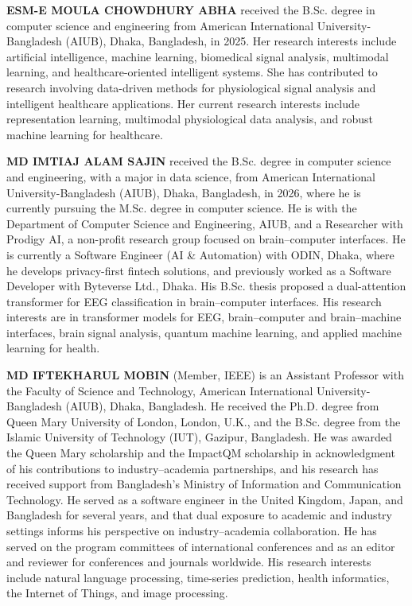 \documentclass[a4paper,fleqn]{cas-sc}
\begin{document}
\textbf{ESM-E MOULA CHOWDHURY ABHA} received the B.Sc. degree in computer science and engineering from American International University-Bangladesh (AIUB), Dhaka, Bangladesh, in 2025. Her research interests include artificial intelligence, machine learning, biomedical signal analysis, multimodal learning, and healthcare-oriented intelligent systems. She has contributed to research involving data-driven methods for physiological signal analysis and intelligent healthcare applications. Her current research interests include representation learning, multimodal physiological data analysis, and robust machine learning for healthcare.
\endbio


\textbf{MD IMTIAJ ALAM SAJIN} received the B.Sc. degree in computer science and engineering, with a major in
data science, from American International University-Bangladesh (AIUB), Dhaka, Bangladesh,
in 2026, where he is currently pursuing the M.Sc. degree in computer science. He is with the
Department of Computer Science and Engineering, AIUB, and a Researcher with Prodigy AI, a
non-profit research group focused on brain--computer interfaces. He is currently a Software
Engineer (AI \& Automation) with ODIN, Dhaka, where he develops privacy-first fintech
solutions, and previously worked as a Software Developer with Byteverse Ltd., Dhaka. His
B.Sc. thesis proposed a dual-attention transformer for EEG classification in
brain--computer interfaces. His research interests are in transformer models for
EEG, brain--computer and brain--machine interfaces, brain signal analysis, quantum machine
learning, and applied machine learning for health.
\endbio



\textbf{MD IFTEKHARUL MOBIN} (Member, IEEE) is an Assistant Professor with the Faculty of Science and
Technology, American International University-Bangladesh (AIUB), Dhaka, Bangladesh. He
received the Ph.D. degree from Queen Mary University of London, London, U.K., and the B.Sc.
degree from the Islamic University of Technology (IUT), Gazipur, Bangladesh. He was awarded
the Queen Mary scholarship and the ImpactQM scholarship in acknowledgment of his
contributions to industry--academia partnerships, and his research has received support
from Bangladesh's Ministry of Information and Communication Technology. He served as a
software engineer in the United Kingdom, Japan, and Bangladesh for several years, and that
dual exposure to academic and industry settings informs his perspective on
industry--academia collaboration. He has served on the program committees of international
conferences and as an editor and reviewer for conferences and journals worldwide. His
research interests include natural language processing, time-series prediction, health
informatics, the Internet of Things, and image processing.
\endbio
\end{document}
